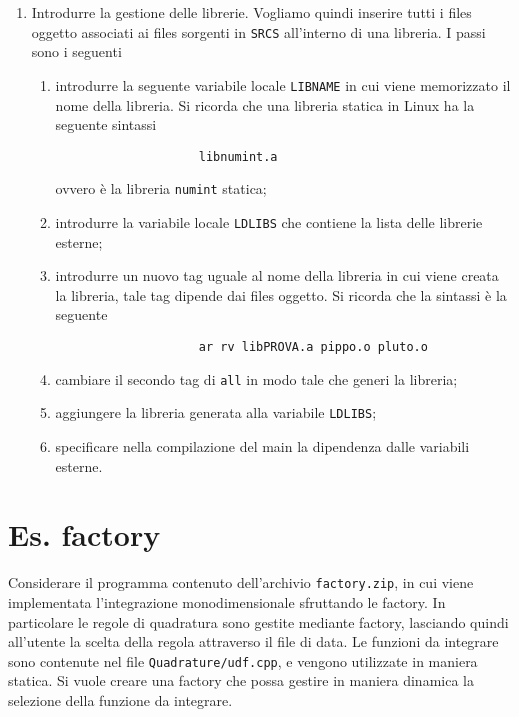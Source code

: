 \begin{enumerate}
		\item Introdurre la gestione delle librerie. Vogliamo quindi inserire tutti i files oggetto associati ai files sorgenti in \texttt{SRCS} all'interno di una libreria. I passi sono i seguenti
		\begin{enumerate}
			\item introdurre la seguente variabile locale \texttt{LIBNAME} in cui viene memorizzato il nome della libreria. Si ricorda che una libreria statica in Linux ha la seguente sintassi
				\begin{verbatim}
					libnumint.a
				\end{verbatim}
				ovvero \`e la libreria \texttt{numint} statica;
			\item introdurre la variabile locale \texttt{LDLIBS} che contiene la lista delle librerie esterne;
			\item introdurre un nuovo tag uguale al nome della libreria in cui viene creata la libreria, tale tag dipende dai files oggetto. Si ricorda che la sintassi \`e la seguente
				\begin{verbatim}
					ar rv libPROVA.a pippo.o pluto.o
				\end{verbatim}
			\item cambiare il secondo tag di \texttt{all} in modo tale che generi la libreria;
			\item aggiungere la libreria generata alla variabile \texttt{LDLIBS};
			\item specificare nella compilazione del main la dipendenza dalle variabili esterne.
		\end{enumerate}			
\end{enumerate}



\section*{Es. factory}

Considerare il programma contenuto dell'archivio \texttt{factory.zip}, in cui viene implementata l'integrazione monodimensionale sfruttando le factory. In particolare le regole di quadratura sono gestite mediante factory, lasciando quindi all'utente la scelta della regola attraverso il file di data. Le funzioni da integrare sono contenute nel file \texttt{Quadrature/udf.cpp}, e vengono utilizzate in maniera statica. Si vuole creare una factory che possa gestire in maniera dinamica la selezione della funzione da integrare.